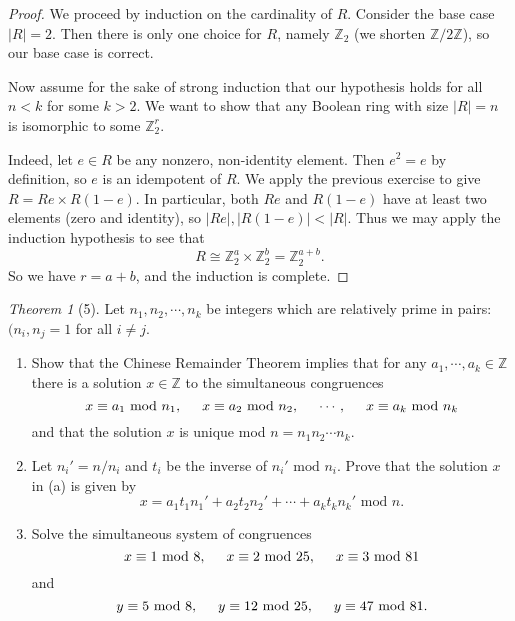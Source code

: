 \documentclass[12pt]{article}
\theoremstyle{remark}
\theoremstyle{named}
\newtheorem*{theorem}{Theorem}
\newcommand{\Z}{\mathbb Z}
\renewcommand{\mod}{\text{ mod }}
\begin{document}
\begin{proof}
    We proceed by induction on the cardinality of \(R\). Consider the base case \(|R| = 2\). Then there is only one choice for \(R\), namely \(\Z_2\) (we shorten \(\Z / 2 \Z\)), so our base case is correct. 

    Now assume for the sake of strong induction that our hypothesis holds for all \(n < k\) for some \(k > 2\). We want to show that any Boolean ring with size \(|R| = n\) is isomorphic to some \(\Z_2^r\).

    Indeed, let \(e \in R\) be any nonzero, non-identity element. Then \(e^2 = e\) by definition, so \(e\) is an idempotent of \(R\). We apply the previous exercise to give \(R = Re \times R(1 - e)\). In particular, both \(Re\) and \(R(1 - e)\) have at least two elements (zero and identity), so \(|Re|, |R(1 - e)| < |R|\). Thus we may apply the induction hypothesis to see that \[R \cong \Z_2^a \times \Z_2^b = \Z_2^{a + b}.\]
    So we have \(r = a + b\), and the induction is complete.
\end{proof}

\begin{theorem}[5]
    Let \(n_1, n_2, \cdots, n_k\) be integers which are relatively prime in pairs: \((n_i, n_j = 1\) for all \(i \neq j\). 
    \begin{enumerate}
        \item Show that the Chinese Remainder Theorem implies that for any \(a_1, \cdots, a_k \in \Z\) there is a solution \(x \in \Z\) to the simultaneous congruences
        \[x \equiv a_1 \mod n_1, \hspace*{5mm} x \equiv a_2 \mod n_2, \hspace*{5mm} \cdots, \hspace*{5mm} x \equiv a_k \mod n_k\]
        and that the solution \(x\) is unique mod \(n = n_1n_2\cdots n_k\).
        \item Let \(n_i' = n / n_i\) and \(t_i\) be the inverse of \(n_i' \mod n_i\). Prove that the solution \(x\) in (a) is given by \[x = a_1 t_1 n_1' + a_2 t_2 n_2' + \cdots + a_k t_k n_k' \mod n.\]
        \item Solve the simultaneous system of congruences
        \[x \equiv 1 \mod 8, \hspace*{5mm} x \equiv 2 \mod 25, \hspace*{5mm} x \equiv 3 \mod 81\]
        and \[y \equiv 5 \mod 8, \hspace*{5mm} y \equiv 12 \mod 25, \hspace*{5mm} y \equiv 47 \mod 81.\]
    \end{enumerate}
\end{theorem}
\end{document}
